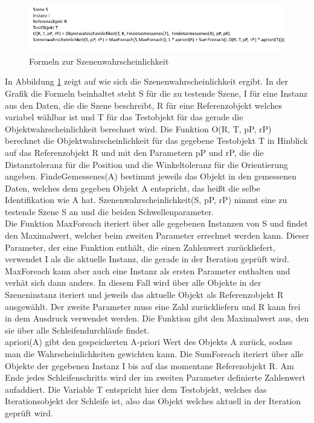 \begin{figure}
	\centering
	\includegraphics[width=14cm]{bilder/FormelnSzene.pdf}
	\caption{Formeln zur Szenenwahrscheinlichkeit}
	\label{img:formelnSzene}
\end{figure}
In Abbildung \ref{img:formelnSzene} zeigt auf wie sich die Szenenwahrscheinlichkeit ergibt. In der Grafik die Formeln beinhaltet steht S für die zu testende Szene, I für eine Instanz aus den Daten, die die Szene beschreibt, R für eine Referenzobjekt welches variabel wählbar ist und T für das Testobjekt für das gerade die Objektwahrscheinlichkeit berechnet wird. Die Funktion O(R, T, pP, rP) berechnet die Objektwahrscheinlichkeit für das gegebene Testobjekt T in Hinblick auf das Referenzobjekt R und mit den Parametern pP und rP, die die Distanztoleranz für die Position und die Winkeltoleranz für die Orientierung angeben. FindeGemessenes(A) bestimmt jeweils das Objekt in den gemessenen Daten, welches dem gegeben Objekt A entspricht, das heißt die selbe Identifikation wie A hat. Szenenwahrscheinlichkeit(S, pP, rP) nimmt eine zu testende Szene S an und die beiden Schwellenparameter.\smallskip\\
Die Funktion MaxForeach iteriert über alle gegebenen Instanzen von S und findet den Maximalwert, welcher beim zweiten Parameter errechnet werden kann. Dieser Parameter, der eine Funktion enthält, die einen Zahlenwert zurückliefert, verwendet I als die aktuelle Instanz, die gerade in der Iteration geprüft wird. MaxForeach kann aber auch eine Instanz als ersten Parameter enthalten und verhät sich dann anders. In diesem Fall wird über alle Objekte in der Szeneninstanz iteriert und jeweils das aktuelle Objekt als Referenzobjekt R ausgewählt. Der zweite Parameter muss eine Zahl zurückliefern und R kann frei in dem Ausdruck verwendet werden. Die Funktion gibt den Maximalwert aus, den sie über alle Schleifendurchläufe findet.\smallskip\\
apriori(A) gibt den gespeicherten A-priori Wert des Objekts A zurück, sodass man die Wahrscheinlichkeiten gewichten kann. Die SumForeach iteriert über alle Objekte der gegebenen Instanz I bis auf das momentane Referezobjekt R. Am Ende jedes Schleifenschritts wird der im zweiten Parameter definierte Zahlenwert aufaddiert. Die Variable T entspricht hier dem Testobjekt, welches das Iterationsobjekt der Schleife ist, also das Objekt welches aktuell in der Iteration geprüft wird.\smallskip\\
